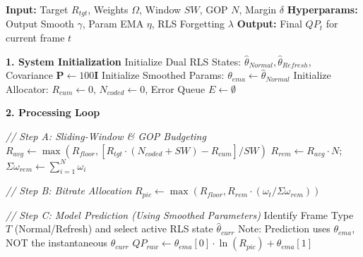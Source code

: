 \begin{algorithm}[t] 
\caption{Proposed Dual-State RLS with Double-Smoothing Strategy}
\label{alg:proposed} 
\begin{algorithmic}[0] 

    \State \textbf{Input:} Target $R_{tgt}$, Weights $\Omega$, Window $SW$, GOP $N$, Margin $\delta$
    \State \textbf{Hyperparams:} Output Smooth $\gamma$, Param EMA $\eta$, RLS Forgetting $\lambda$
    \State \textbf{Output:} Final $QP_t$ for current frame $t$
    
    \vspace{0.5em} 
    \State \textbf{1. System Initialization}
    \State \quad Initialize Dual RLS States: $\hat{\theta}_{Normal}, \hat{\theta}_{Refresh}$, Covariance $\mathbf{P} \leftarrow 100\mathbf{I}$
    \State \quad Initialize Smoothed Params: $\theta_{ema} \leftarrow \hat{\theta}_{Normal}$
    \State \quad Initialize Allocator: $R_{cum} \leftarrow 0$, $N_{coded} \leftarrow 0$, Error Queue $E \leftarrow \emptyset$

    \vspace{0.5em}
    \State \textbf{2. Processing Loop}
    
        \vspace{0.3em}
        \State \textit{// Step A: Sliding-Window \& GOP Budgeting}
            \State $R_{avg} \leftarrow \max(R_{floor}, [R_{tgt} \cdot (N_{coded} + SW) - R_{cum}] / SW)$
            \State $R_{rem} \leftarrow R_{avg} \cdot N$; \quad $\Sigma\omega_{rem} \leftarrow \sum_{i=1}^{N} \omega_i$
        \EndIf

        \vspace{0.3em}
        \State \textit{// Step B: Bitrate Allocation}
        \State $R_{pic} \leftarrow \max(R_{floor}, R_{rem} \cdot (\omega_t / \Sigma\omega_{rem}))$

        \vspace{0.5em}
        \State \textit{// Step C: Model Prediction (Using Smoothed Parameters)}
        \State Identify Frame Type $T$ (Normal/Refresh) and select active RLS state $\hat{\theta}_{curr}$
        \State Note: Prediction uses $\theta_{ema}$, NOT the instantaneous $\hat{\theta}_{curr}$
        \State $QP_{raw} \leftarrow \theta_{ema}[0] \cdot \ln(R_{pic}) + \theta_{ema}[1]$
        

\end{algorithmic}
\end{algorithm}
